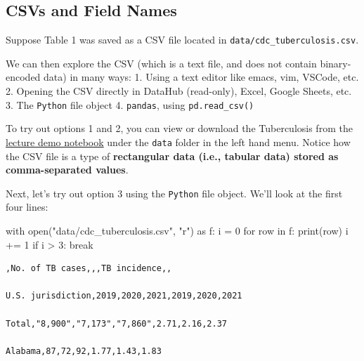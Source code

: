 \documentclass[
  letterpaper,
  DIV=11,
  numbers=noendperiod]{scrreprt}
\newenvironment{Shaded}{\begin{snugshade}}{\end{snugshade}}
\newcommand{\BuiltInTok}[1]{\textcolor[rgb]{0.00,0.23,0.31}{#1}}
\newcommand{\ControlFlowTok}[1]{\textcolor[rgb]{0.00,0.23,0.31}{#1}}
\newcommand{\DecValTok}[1]{\textcolor[rgb]{0.68,0.00,0.00}{#1}}
\newcommand{\ImportTok}[1]{\textcolor[rgb]{0.00,0.46,0.62}{#1}}
\newcommand{\KeywordTok}[1]{\textcolor[rgb]{0.00,0.23,0.31}{#1}}
\newcommand{\NormalTok}[1]{\textcolor[rgb]{0.00,0.23,0.31}{#1}}
\newcommand{\OperatorTok}[1]{\textcolor[rgb]{0.37,0.37,0.37}{#1}}
\newcommand{\StringTok}[1]{\textcolor[rgb]{0.13,0.47,0.30}{#1}}
\begin{document}
\hypertarget{csvs-and-field-names}{%
\subsection{CSVs and Field Names}\label{csvs-and-field-names}}

Suppose Table 1 was saved as a CSV file located in
\texttt{data/cdc\_tuberculosis.csv}.

We can then explore the CSV (which is a text file, and does not contain
binary-encoded data) in many ways: 1. Using a text editor like emacs,
vim, VSCode, etc. 2. Opening the CSV directly in DataHub (read-only),
Excel, Google Sheets, etc. 3. The \texttt{Python} file object 4.
\texttt{pandas}, using \texttt{pd.read\_csv()}

To try out options 1 and 2, you can view or download the Tuberculosis
from the
\href{https://data100.datahub.berkeley.edu/hub/user-redirect/git-pull?repo=https\%3A\%2F\%2Fgithub.com\%2FDS-100\%2Ffa23-student\&urlpath=lab\%2Ftree\%2Ffa23-student\%2Flecture\%2Flec05\%2Flec04-eda.ipynb\&branch=main}{lecture
demo notebook} under the \texttt{data} folder in the left hand menu.
Notice how the CSV file is a type of \textbf{rectangular data (i.e.,
tabular data) stored as comma-separated values}.

Next, let's try out option 3 using the \texttt{Python} file object.
We'll look at the first four lines:

\begin{Shaded}
\begin{Highlighting}[]
\ControlFlowTok{with} \BuiltInTok{open}\NormalTok{(}\StringTok{"data/cdc\_tuberculosis.csv"}\NormalTok{, }\StringTok{"r"}\NormalTok{) }\ImportTok{as}\NormalTok{ f:}
\NormalTok{    i }\OperatorTok{=} \DecValTok{0}
    \ControlFlowTok{for}\NormalTok{ row }\KeywordTok{in}\NormalTok{ f:}
        \BuiltInTok{print}\NormalTok{(row)}
\NormalTok{        i }\OperatorTok{+=} \DecValTok{1}
        \ControlFlowTok{if}\NormalTok{ i }\OperatorTok{\textgreater{}} \DecValTok{3}\NormalTok{:}
            \ControlFlowTok{break}
\end{Highlighting}
\end{Shaded}

\begin{verbatim}
,No. of TB cases,,,TB incidence,,

U.S. jurisdiction,2019,2020,2021,2019,2020,2021

Total,"8,900","7,173","7,860",2.71,2.16,2.37

Alabama,87,72,92,1.77,1.43,1.83
\end{verbatim}
\end{document}
